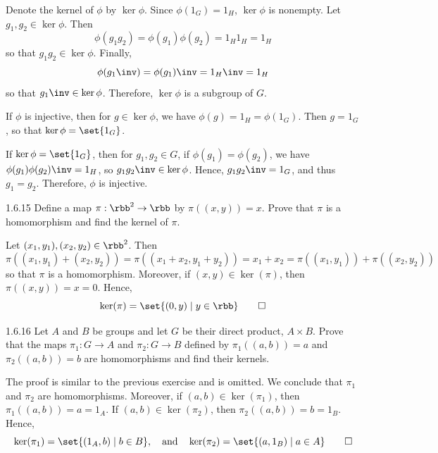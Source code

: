 \begin{sol}[spsol]
    Denote the kernel of $\phi$ by $\ker\phi$.
	Since $\phi(1_G) = 1_H$, $\ker\phi$ is nonempty.
    Let $g_1, g_2 \in \ker\phi$.
	Then
    \[
    	\phi(g_1g_2) = \phi(g_1)\phi(g_2) = 1_H1_H = 1_H
    \]
    so that $g_1g_2 \in \ker\phi$.
	Finally,
    \[
    	\phi(g_1\inv) = \phi(g_1)\inv = 1_H\inv = 1_H
    \]
    so that $g_1\inv \in \ker\phi$.
	Therefore, $\ker\phi$ is a subgroup of $G$.

    \rightimp If $\phi$ is injective, then for $g \in \ker\phi$, we have $\phi(g) = 1_H = \phi(1_G)$.
	Then $g = 1_G$, so that $\ker\phi = \set{1_G}$.

    \leftimp If $\ker\phi = \set{1_G}$, then for $g_1, g_2 \in G$, if $\phi(g_1) = \phi(g_2)$, we have $\phi(g_1)\phi(g_2)\inv = 1_H$, so $g_1g_2\inv \in \ker\phi$.
	Hence, $g_1g_2\inv = 1_G$, and thus $g_1 = g_2$.
	Therefore, $\phi$ is injective.
\end{sol}

\begin{exercise}{1.6.15}
    Define a map $\pi : \rbb^2 \to \rbb$ by $\pi((x,y)) = x$.
	Prove that $\pi$ is a homomorphism and find the kernel of $\pi$.
\end{exercise}

\begin{sol}
    Let $(x_1, y_1), (x_2, y_2) \in \rbb^2$.
	Then
    \[
    	\pi((x_1, y_1) + (x_2, y_2)) = \pi((x_1 + x_2, y_1 + y_2)) = x_1 + x_2 = \pi((x_1, y_1)) + \pi((x_2, y_2))
    \]
    so that $\pi$ is a homomorphism.
	Moreover, if $(x, y) \in \ker(\pi)$, then $\pi((x, y)) = x = 0$.
	Hence,
    \[
    	\ker(\pi) = \set{(0, y) \mid y \in \rbb} \qedhere
    \]
\end{sol}

\begin{exercise}{1.6.16}
    Let $A$ and $B$ be groups and let $G$ be their direct product, $A \times B$.
	Prove that the maps $\pi_1 : G \to A$ and $\pi_2 : G \to B$ defined by $\pi_1((a,b)) = a$ and $\pi_2((a,b)) = b$ are homomorphisms and find their kernels.
\end{exercise}

\begin{sol}
    The proof is similar to the previous exercise and is omitted.
    We conclude that $\pi_1$ and $\pi_2$ are homomorphisms.
	Moreover, if $(a, b) \in \ker(\pi_1)$, then $\pi_1((a, b)) = a = 1_A$.
	If $(a, b) \in \ker(\pi_2)$, then $\pi_2((a, b)) = b = 1_B$.
	Hence,
    \[
    	\ker(\pi_1) = \set{(1_A, b) \mid b \in B}, \quad \text{and} \quad \ker(\pi_2) = \set{(a, 1_B) \mid a \in A} \qedhere
    \]
\end{sol}

